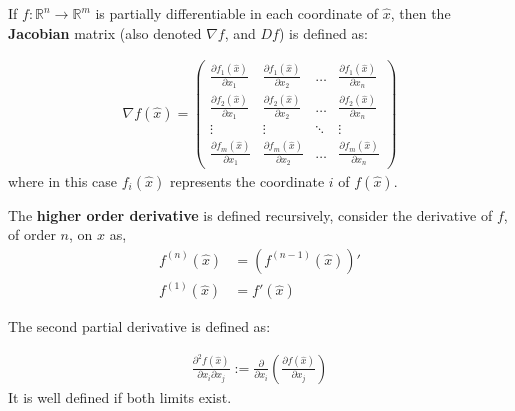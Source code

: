 \documentclass[aspectratio=169]{beamer}
\begin{document}
\begin{frame}
    \begin{definition}
        If $f:\mathds{R}^n\rightarrow\mathds{R}^m$ is partially differentiable in each coordinate of $\hat{x}$, then the \textbf{Jacobian} matrix (also denoted $\nabla f$, and $D f$) is defined as:
    
    \begin{align*}
        \nabla f(\hat{x}) = \left(\begin{array}{cccc}\frac{\partial f_1(\hat{x})}{\partial x_1} & \frac{\partial f_1(\hat{x})}{\partial x_2} & \ldots & \frac{\partial f_1(\hat{x})}{\partial x_n} \\
        \frac{\partial f_2(\hat{x})}{\partial x_1} & \frac{\partial f_2(\hat{x})}{\partial x_2} & \ldots & \frac{\partial f_2(\hat{x})}{\partial x_n} \\
        \vdots & \vdots & \ddots & \vdots \\
        \frac{\partial f_m(\hat{x})}{\partial x_1} & \frac{\partial f_m(\hat{x})}{\partial x_2}& \ldots & \frac{\partial f_m(\hat{x})}{\partial x_n}
        \end{array}\right)
    \end{align*}
    where in this case $f_i(\hat{x})$ represents the coordinate $i$ of $f(\hat{x})$.
    \end{definition}
\end{frame}

\begin{frame}
    \begin{definition}
    
    The \textbf{higher order derivative} is defined recursively, consider the derivative of $f$, of order $n$, on $\hat{x}$ as,
    \begin{align*}
      f^{(n)}(\hat{x})&=(f^{(n-1)}(\hat{x}))'\\
      f^{(1)}(\hat{x})&=f'(\hat{x})  
    \end{align*}
    
    \end{definition}
    
    \begin{definition}
        The second partial derivative is defined as:
        
        \begin{align*}
            \frac{\partial^2f(\hat{x})}{\partial x_i \partial x_j}  := \frac{\partial}{\partial x_i}\left(\frac{\partial f(\hat{x})}{\partial x_j}\right)
        \end{align*}
        It is well defined if both limits exist.
    \end{definition}
\end{frame}
\end{document}
